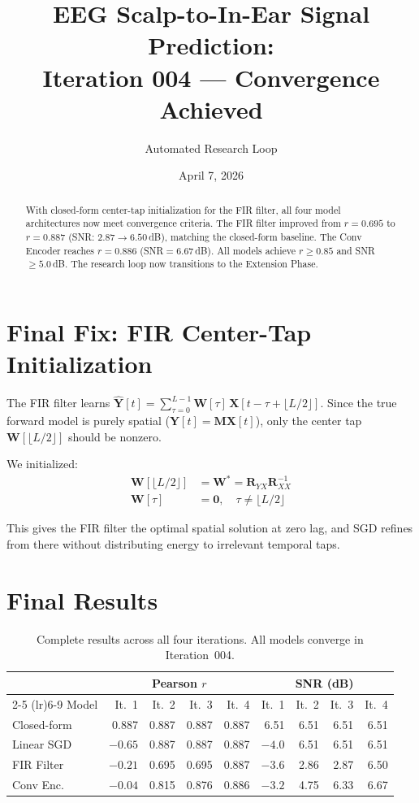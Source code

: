 \documentclass[11pt,a4paper]{article}
\title{EEG Scalp-to-In-Ear Signal Prediction:\\
  Iteration 004 --- Convergence Achieved}
\author{Automated Research Loop}
\date{April 7, 2026}
\begin{document}
\maketitle

\begin{abstract}
With closed-form center-tap initialization for the FIR filter, all four model
architectures now meet convergence criteria. The FIR filter improved from
$r=0.695$ to $r=0.887$ (SNR: $2.87 \to 6.50$\,dB), matching the closed-form
baseline. The Conv Encoder reaches $r=0.886$ (SNR$=6.67$\,dB). All models
achieve $r \geq 0.85$ and SNR $\geq 5.0$\,dB. The research loop now transitions
to the Extension Phase.
\end{abstract}

\section{Final Fix: FIR Center-Tap Initialization}

The FIR filter learns $\hat{\mathbf{Y}}[t] = \sum_{\tau=0}^{L-1}
\mathbf{W}[\tau]\,\mathbf{X}[t-\tau+\lfloor L/2 \rfloor]$. Since the true
forward model is purely spatial ($\mathbf{Y}[t] = \mathbf{M}\mathbf{X}[t]$),
only the center tap $\mathbf{W}[\lfloor L/2 \rfloor]$ should be nonzero.

We initialized:
\begin{align}
  \mathbf{W}[\lfloor L/2 \rfloor] &= \mathbf{W}^* = \mathbf{R}_{YX}\mathbf{R}_{XX}^{-1} \\
  \mathbf{W}[\tau] &= \mathbf{0}, \quad \tau \neq \lfloor L/2 \rfloor
\end{align}

This gives the FIR filter the optimal spatial solution at zero lag, and SGD
refines from there without distributing energy to irrelevant temporal taps.

\section{Final Results}

\begin{table}[H]
\centering
\caption{Complete results across all four iterations. All models converge in Iteration~004.}
\begin{tabular}{lrrrrrrrr}
\toprule
& \multicolumn{4}{c}{Pearson $r$} & \multicolumn{4}{c}{SNR (dB)} \\
\cmidrule(lr){2-5} \cmidrule(lr){6-9}
Model & It.~1 & It.~2 & It.~3 & It.~4 & It.~1 & It.~2 & It.~3 & It.~4 \\
\midrule
Closed-form & 0.887 & 0.887 & 0.887 & 0.887 & 6.51 & 6.51 & 6.51 & 6.51 \\
Linear SGD & $-0.65$ & 0.887 & 0.887 & 0.887 & $-4.0$ & 6.51 & 6.51 & 6.51 \\
FIR Filter & $-0.21$ & 0.695 & 0.695 & \textcolor{good}{0.887} & $-3.6$ & 2.86 & 2.87 & \textcolor{good}{6.50} \\
Conv Enc. & $-0.04$ & 0.815 & 0.876 & \textcolor{good}{0.886} & $-3.2$ & 4.75 & 6.33 & \textcolor{good}{6.67} \\
\bottomrule
\end{tabular}
\end{table}
\end{document}
